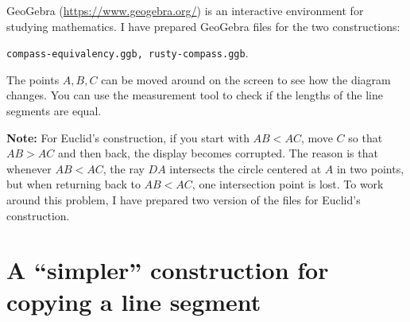 \documentclass[11pt,a4paper]{article}
\begin{document}
GeoGebra (\url{https://www.geogebra.org/}) is an interactive environment for studying mathematics. I have prepared GeoGebra files for the two constructions: 
\begin{center}
\texttt{compass-equivalency.ggb, rusty-compass.ggb}.
\end{center}
The points $A,B,C$ can be moved around on the screen to see how the diagram changes. You can use the measurement tool to check if the lengths of the line segments are equal.

\textbf{Note:} For Euclid's construction, if you start with $AB<AC$, move $C$ so that $AB>AC$ and then back, the display becomes corrupted. The reason is that whenever $AB<AC$, the ray $DA$ intersects the circle centered at $A$ in two points, but when returning back to $AB<AC$, one intersection point is lost. To work around this problem, I have prepared two version of the files for Euclid's construction.


\section{A ``simpler'' construction for copying a line segment}
\end{document}
